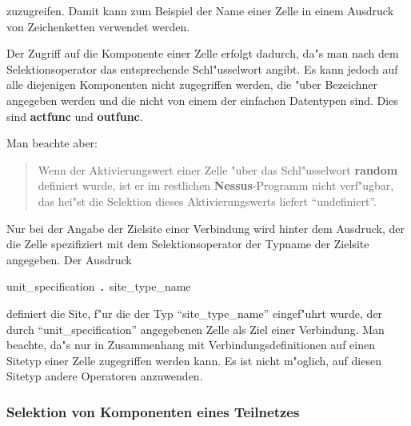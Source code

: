 zuzugreifen. Damit kann zum Beispiel der Name einer Zelle in einem
Ausdruck von Zeichenketten verwendet werden.

Der Zugriff auf die Komponente einer Zelle erfolgt dadurch, da"s man
nach dem Selektionsoperator das entsprechende Schl"usselwort angibt.
Es kann jedoch auf alle diejenigen Komponenten nicht zugegriffen
werden, die "uber Bezeichner angegeben werden und
die nicht von einem der einfachen Datentypen sind. Dies sind {\bf
actfunc} und {\bf outfunc}.

Man beachte aber:
\begin{quote}
  Wenn der Aktivierungswert einer Zelle "uber das Schl"usselwort {\bf
random} definiert wurde, 
ist er im restlichen {\bf Nessus}-Programm nicht verf"ugbar, das
hei"st die Selektion dieses Aktivierungswerts liefert
``undefiniert''.
\end{quote}

Nur bei der Angabe der Zielsite einer Verbindung wird hinter dem
Ausdruck, der die Zelle spezifiziert mit dem Selektionsoperator der
Typname der Zielsite angegeben. Der Ausdruck

\centerline{unit\_specification~{\bf .}~site\_type\_name} 

definiert die Site, f"ur die der Typ ``site\_type\_name'' eingef"uhrt
wurde, der durch ``unit\_specification'' angegebenen Zelle als Ziel
einer Verbindung.  Man beachte, da"s nur in Zusammenhang mit
Verbindungsdefinitionen auf einen Sitetyp einer Zelle zugegriffen
werden kann. Es ist nicht m"oglich, auf diesen Sitetyp andere
Operatoren anzuwenden.

\begin{center}
\end{center}


\subsubsection{Selektion von Komponenten eines Teilnetzes}

